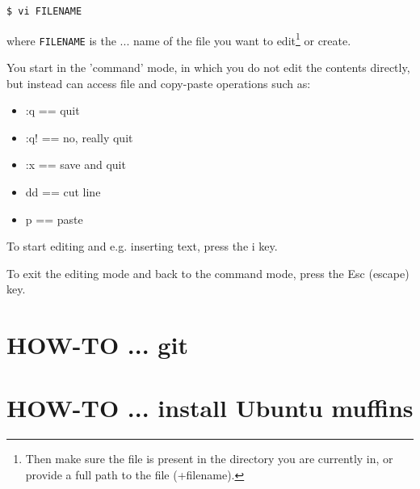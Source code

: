 \documentclass[11pt,fleqn]{book} %
\begin{document}
\begin{verbatim}
$ vi FILENAME
\end{verbatim}

\noindent where \texttt{FILENAME} is the ... name of the file you want to edit\footnote{Then make sure the file is present in the directory you are currently in, or provide a full path to the file (+filename).} or create.

You start in the 'command' mode, in which you do not edit the contents directly, but instead can access file and copy-paste operations such as:

\vspace{2mm}
\begin{itemize}[noitemsep]
\setlength{\itemindent}{.2in}
\item :q == quit
\item :q! == no, really quit
\item :x == save and quit
\item dd == cut line
\item p == paste
\end{itemize}
\vspace{2mm}

To start editing and e.g. inserting text, press the \textsf{i} key.

To exit the editing mode and back to the command mode, press the \textsf{Esc} (escape) key.


\newpage


\section{HOW-TO ... git}\label{how-to-git}
\vspace{2mm}

%






\newpage


\section{HOW-TO ... install Ubuntu muffins}\label{how-to-ubuntu}
\vspace{2mm}
\end{document}
